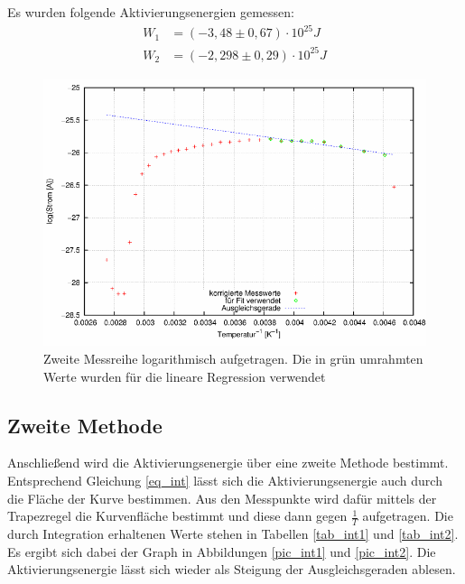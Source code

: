 Es wurden folgende Aktivierungsenergien gemessen:
\begin{align}
W_1&=(-3,48\pm 0,67)\cdot10^{25} J\\
W_2&=(-2,298 \pm 0,29)\cdot10^{25} J
\end{align}
\begin{figure}[H]
\includegraphics[scale=0.8]{../gnu/relax22.pdf}
\caption{Zweite Messreihe logarithmisch aufgetragen. Die in grün umrahmten Werte wurden für die lineare Regression verwendet}
\label{pic_22}
\end{figure}

\subsection{Zweite Methode}
Anschließend wird die Aktivierungsenergie über eine zweite Methode bestimmt. Entsprechend Gleichung \eqref{eq_int} lässt sich die Aktivierungsenergie auch durch die Fläche der Kurve bestimmen. Aus den Messpunkte wird dafür mittels der Trapezregel die Kurvenfläche bestimmt und diese dann gegen $\frac{1}{T}$ aufgetragen. Die durch Integration erhaltenen Werte stehen in Tabellen \ref{tab_int1} und \ref{tab_int2}. Es ergibt sich dabei der Graph in Abbildungen \ref{pic_int1} und \ref{pic_int2}. Die Aktivierungsenergie lässt sich wieder als Steigung der Ausgleichsgeraden ablesen.

